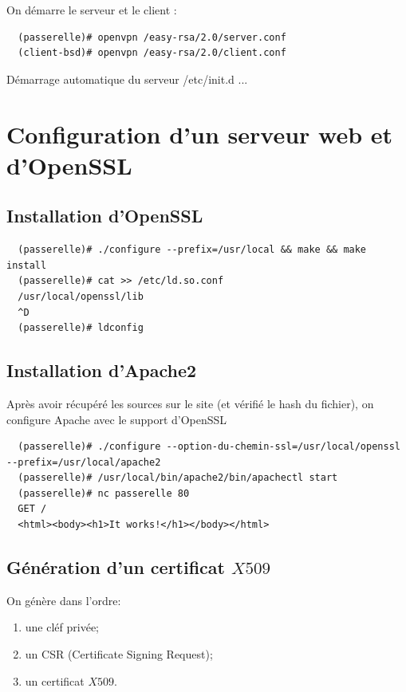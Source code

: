 \documentclass[a4paper]{article}
\begin{document}
On démarre le serveur et le client :
\begin{verbatim}
  (passerelle)# openvpn /easy-rsa/2.0/server.conf
  (client-bsd)# openvpn /easy-rsa/2.0/client.conf
\end{verbatim}

Démarrage automatique du serveur /etc/init.d ...

\section{Configuration d'un serveur web et d'OpenSSL}
\subsection{Installation d'OpenSSL}
\begin{verbatim}
  (passerelle)# ./configure --prefix=/usr/local && make && make install
  (passerelle)# cat >> /etc/ld.so.conf
  /usr/local/openssl/lib
  ^D
  (passerelle)# ldconfig
\end{verbatim}

\subsection{Installation d'Apache2}
Après avoir récupéré les sources sur le site (et vérifié le hash du fichier), on configure
Apache avec le support d'OpenSSL
\begin{verbatim}
  (passerelle)# ./configure --option-du-chemin-ssl=/usr/local/openssl --prefix=/usr/local/apache2
  (passerelle)# /usr/local/bin/apache2/bin/apachectl start
  (passerelle)# nc passerelle 80
  GET /
  <html><body><h1>It works!</h1></body></html>
\end{verbatim}

\subsection{Génération d'un certificat $X509$}
On génère dans l'ordre:
\begin{enumerate}
	\item une cléf privée;
	\item un CSR (Certificate Signing Request);
	\item un certificat $X509$.
\end{enumerate}
\end{document}

